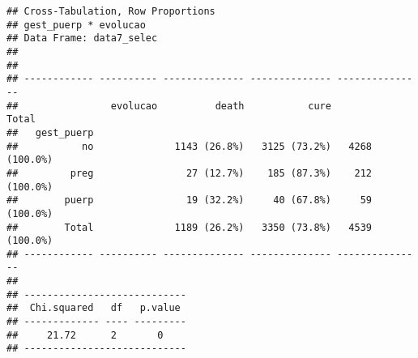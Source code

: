 \documentclass[
]{article}
\newenvironment{Shaded}{\begin{snugshade}}{\end{snugshade}}
\newcommand{\DataTypeTok}[1]{\textcolor[rgb]{0.13,0.29,0.53}{#1}}
\newcommand{\KeywordTok}[1]{\textcolor[rgb]{0.13,0.29,0.53}{\textbf{#1}}}
\newcommand{\NormalTok}[1]{#1}
\newcommand{\OperatorTok}[1]{\textcolor[rgb]{0.81,0.36,0.00}{\textbf{#1}}}
\newcommand{\OtherTok}[1]{\textcolor[rgb]{0.56,0.35,0.01}{#1}}
\newcommand{\StringTok}[1]{\textcolor[rgb]{0.31,0.60,0.02}{#1}}
\begin{document}
\begin{Shaded}
\end{Shaded}

\begin{Shaded}
\end{Shaded}

\begin{verbatim}
## Cross-Tabulation, Row Proportions  
## gest_puerp * evolucao  
## Data Frame: data7_selec  
## 
## 
## ------------ ---------- -------------- -------------- ---------------
##                evolucao          death           cure           Total
##   gest_puerp                                                         
##           no              1143 (26.8%)   3125 (73.2%)   4268 (100.0%)
##         preg                27 (12.7%)    185 (87.3%)    212 (100.0%)
##        puerp                19 (32.2%)     40 (67.8%)     59 (100.0%)
##        Total              1189 (26.2%)   3350 (73.8%)   4539 (100.0%)
## ------------ ---------- -------------- -------------- ---------------
## 
## ----------------------------
##  Chi.squared   df   p.value 
## ------------- ---- ---------
##     21.72      2       0    
## ----------------------------
\end{verbatim}

\begin{Shaded}
\end{Shaded}
\end{document}
